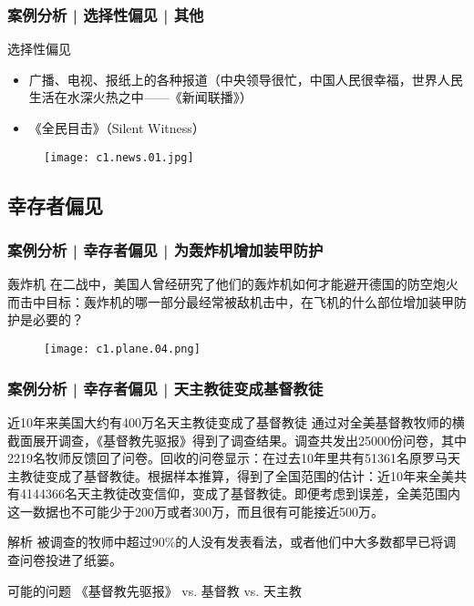 \begin{frame}
  \frametitle{案例分析 | 选择性偏见 | 其他}
  \begin{block}{选择性偏见}
    \begin{itemize}
      \item 广播、电视、报纸上的各种报道（中央领导很忙，中国人民很幸福，世界人民生活在水深火热之中——《新闻联播》）
      \item 《全民目击》（Silent Witness）
    \end{itemize}
    \vspace{-1em}
    \begin{figure}
      \centering
      \texttt{[image: c1.news.01.jpg]}
    \end{figure}
  \end{block}
\end{frame}

\subsection{幸存者偏见}
\begin{frame}
  \frametitle{案例分析 | 幸存者偏见 | 为轰炸机增加装甲防护}
  \begin{block}{轰炸机}
在二战中，美国人曾经研究了他们的轰炸机如何才能避开德国的防空炮火而击中目标：轰炸机的哪一部分最经常被敌机击中，在飞机的什么部位增加装甲防护是必要的？
  \end{block}
  \begin{figure}
    \centering
    \texttt{[image: c1.plane.04.png]}
  \end{figure}
\end{frame}

\begin{frame}
  \frametitle{案例分析 | 幸存者偏见 | 天主教徒变成基督教徒}
  \begin{block}{近10年来美国大约有400万名天主教徒变成了基督教徒}
通过对全美基督教牧师的横截面展开调查，《基督教先驱报》得到了调查结果。调查共发出25000份问卷，其中2219名牧师反馈回了问卷。回收的问卷显示：在过去10年里共有51361名原罗马天主教徒变成了基督教徒。根据样本推算，得到了全国范围的估计：近10年来全美共有4144366名天主教徒改变信仰，变成了基督教徒。即便考虑到误差，全美范围内这一数据也不可能少于200万或者300万，而且很有可能接近500万。
  \end{block}
  \pause
  \begin{block}{解析}
    被调查的牧师中超过90\%的人没有发表看法，或者他们中大多数都早已将调查问卷投进了纸篓。
  \end{block}
  \pause
  \begin{block}{可能的问题}
    《基督教先驱报》 vs. 基督教 vs. 天主教
  \end{block}
\end{frame}


